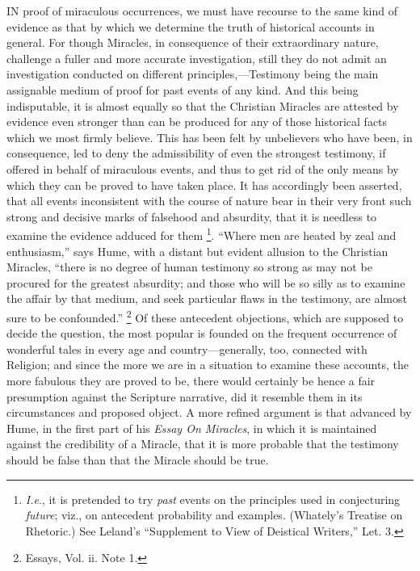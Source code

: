 IN
proof of miraculous occurrences, we must have recourse to the same
kind of evidence as that by which we determine the truth of historical
accounts in general. For though Miracles, in consequence of their
extraordinary nature, challenge a fuller and more accurate
investigation, still they do not admit an investigation conducted on
different principles,—Testimony being the main assignable medium of
proof for past events of any kind. And this being indisputable, it is
almost equally so that the Christian Miracles are attested by evidence
even stronger than can be produced for any of those historical facts
which we most firmly believe. This has been felt by unbelievers who
have been, in consequence, led to deny the admissibility of even the
strongest testimony, if offered in behalf of miraculous events, and
thus to get rid of the only means by which they can be proved to have
taken place. It has accordingly been asserted, that all events
inconsistent with the course of nature bear in their very front such
strong and decisive marks of falsehood and absurdity, that it is
needless to examine the evidence adduced for them \footnote{\emph{I.e}., it is pretended to try \emph{past}
events on the principles used in conjecturing \emph{future}; viz., on
antecedent probability and examples. (Whately's Treatise on
Rhetoric.) See Leland's ``Supplement to View of Deistical
Writers,'' Let. 3.}. ``Where men are heated by zeal and enthusiasm,'' says Hume, with
a distant but evident allusion to the Christian Miracles, ``there is
no degree of human testimony so strong as may not be procured for the
greatest absurdity; and those who will be so silly as to examine the
affair by that medium, and seek particular flaws in the testimony, are
almost sure to be confounded.'' \footnote{Essays, Vol. ii. Note 1.} Of
these antecedent objections, which are supposed to decide the
question, the most popular is founded on the frequent occurrence of
wonderful tales in every age and country—generally, too, connected
with Religion; and since the more we are in a situation to examine
these accounts, the more fabulous they are proved to be, there would
certainly be hence a fair presumption against the Scripture narrative,
did it resemble them in its circumstances and proposed object. A more
refined argument is that advanced by Hume, in the first part of his \emph{Essay
On Miracles}, in which it is maintained against the credibility of
a Miracle, that it is more probable that the testimony should be
false than that the Miracle should be true.

